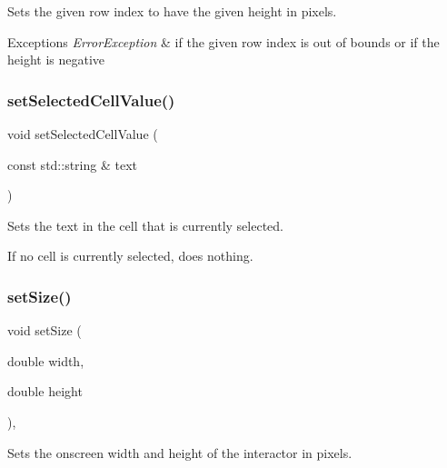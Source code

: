 Sets the given row index to have the given height in pixels. 


\begin{DoxyExceptions}{Exceptions}
{\em Error\+Exception} & if the given row index is out of bounds or if the height is negative \\
\hline
\end{DoxyExceptions}
\mbox{\label{classGTable_a3120b24ea5aaa17d8a7192742c00bcfb}} 
\subsubsection{\texorpdfstring{set\+Selected\+Cell\+Value()}{setSelectedCellValue()}}
{\footnotesize\ttfamily void set\+Selected\+Cell\+Value (\begin{DoxyParamCaption}\item[{const std\+::string \&}]{text }\end{DoxyParamCaption})\hspace{0.3cm}{\ttfamily [virtual]}}



Sets the text in the cell that is currently selected. 

If no cell is currently selected, does nothing. \mbox{\label{classGInteractor_aca25d49481f9bf5fc8f7df4c086c4ce7}} 
\subsubsection{\texorpdfstring{set\+Size()}{setSize()}\hspace{0.1cm}{\footnotesize\ttfamily [1/2]}}
{\footnotesize\ttfamily void set\+Size (\begin{DoxyParamCaption}\item[{double}]{width,  }\item[{double}]{height }\end{DoxyParamCaption})\hspace{0.3cm}{\ttfamily [virtual]}, {\ttfamily [inherited]}}



Sets the onscreen width and height of the interactor in pixels. 


